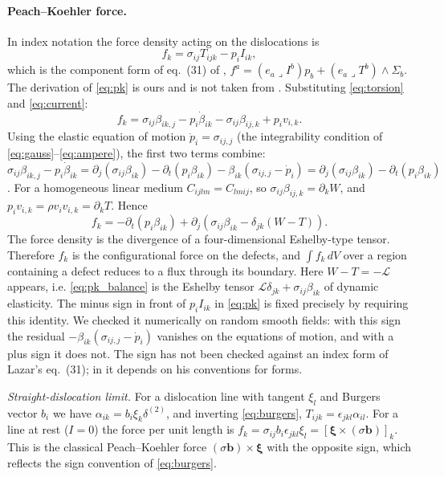 \documentclass[12pt,a4paper]{article}
\begin{document}
\paragraph{Peach--Koehler force.} In index notation the force density acting on the
dislocations is
\begin{equation}
f_k=\sigma_{ij}T_{ijk}-p_iI_{ik},
\label{eq:pk}
\end{equation}
which is the component form of eq.~(31) of \cite{lazar2010},
$f^a=(e_a\lrcorner I^b)p_b+(e_a\lrcorner T^b)\wedge\Sigma_b$. The derivation of
\eqref{eq:pk} is ours and is not taken from \cite{lazar2010pla}. Substituting
\eqref{eq:torsion} and \eqref{eq:current}:
\[
f_k=\sigma_{ij}\beta_{ik,j}-p_i\dot\beta_{ik}-\sigma_{ij}\beta_{ij,k}+p_iv_{i,k}.
\]
Using the elastic equation of motion $\dot p_i=\sigma_{ij,j}$ (the integrability
condition of \eqref{eq:gauss}--\eqref{eq:ampere}), the first two terms combine:
$\sigma_{ij}\beta_{ik,j}-p_i\dot\beta_{ik}=\partial_j(\sigma_{ij}\beta_{ik})-\partial_t(p_i\beta_{ik})-\beta_{ik}(\sigma_{ij,j}-\dot p_i)=\partial_j(\sigma_{ij}\beta_{ik})-\partial_t(p_i\beta_{ik})$.
For a homogeneous linear medium $C_{ijlm}=C_{lmij}$, so
$\sigma_{ij}\beta_{ij,k}=\partial_kW$, and $p_iv_{i,k}=\rho v_iv_{i,k}=\partial_kT$.
Hence
\begin{equation}
f_k=-\partial_t\!\left(p_i\beta_{ik}\right)+\partial_j\!\left(\sigma_{ij}\beta_{ik}-\delta_{jk}(W-T)\right).
\label{eq:pk_balance}
\end{equation}
The force density is the divergence of a four-dimensional Eshelby-type tensor.
Therefore $f_k$ is the configurational force on the defects, and $\int f_k\,dV$ over a
region containing a defect reduces to a flux through its boundary. Here $W-T=-\mathcal L$ appears, i.e.
\eqref{eq:pk_balance} is the Eshelby tensor $\mathcal L\delta_{jk}+\sigma_{ij}\beta_{ik}$
of dynamic elasticity. The minus sign in front of $p_iI_{ik}$ in \eqref{eq:pk} is fixed
precisely by requiring this identity. We checked it numerically on random smooth
fields: with this sign the residual $-\beta_{ik}(\sigma_{ij,j}-\dot p_i)$ vanishes on
the equations of motion, and with a plus sign it does not. The sign has not been
checked against an index form of Lazar's eq.~(31); in \cite{lazar2010} it depends on
his conventions for forms.

\textit{Straight-dislocation limit.} For a dislocation line with tangent $\xi_l$ and
Burgers vector $b_i$ we have $\alpha_{ik}=b_i\xi_k\delta^{(2)}$, and inverting
\eqref{eq:burgers}, $T_{ijk}=\epsilon_{jkl}\alpha_{il}$. For a line at rest ($I=0$)
the force per unit length is
$f_k=\sigma_{ij}b_i\epsilon_{jkl}\xi_l=[\boldsymbol\xi\times(\sigma\mathbf b)]_k$.
This is the classical Peach--Koehler force $(\sigma\mathbf b)\times\boldsymbol\xi$
with the opposite sign, which reflects the sign convention of \eqref{eq:burgers}.
\end{document}
